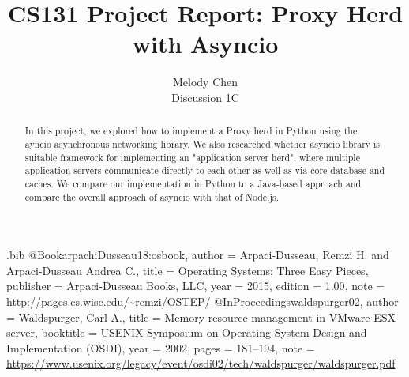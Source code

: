 \usepackage{filecontents}

\begin{filecontents}{\jobname.bib}
@Book{arpachiDusseau18:osbook,
  author =       {Arpaci-Dusseau, Remzi H. and Arpaci-Dusseau Andrea C.},
  title =        {Operating Systems: Three Easy Pieces},
  publisher =    {Arpaci-Dusseau Books, LLC},
  year =         2015,
  edition =      {1.00},
  note =         {\url{http://pages.cs.wisc.edu/~remzi/OSTEP/}}
}
@InProceedings{waldspurger02,
  author =       {Waldspurger, Carl A.},
  title =        {Memory resource management in {VMware ESX} server},
  booktitle =    {USENIX Symposium on Operating System Design and
                  Implementation (OSDI)},
  year =         2002,
  pages =        {181--194},
  note =         {\url{https://www.usenix.org/legacy/event/osdi02/tech/waldspurger/waldspurger.pdf}}}
\end{filecontents}



\date{}

\title{\Large \bf CS131 Project Report: Proxy Herd with Asyncio}

\author{
{\rm Melody Chen}\\
Discussion 1C
} %

\maketitle

\begin{abstract}
In this project, we explored how to implement a Proxy herd in Python using the ayncio asynchronous networking library. We also researched whether asyncio library is suitable framework for implementing an "application server herd", where multiple application servers communicate directly to each other as well as via core database and caches.  We compare our implementation in Python to a Java-based approach and compare the overall approach of asyncio with that of Node.js.
\end{abstract}


